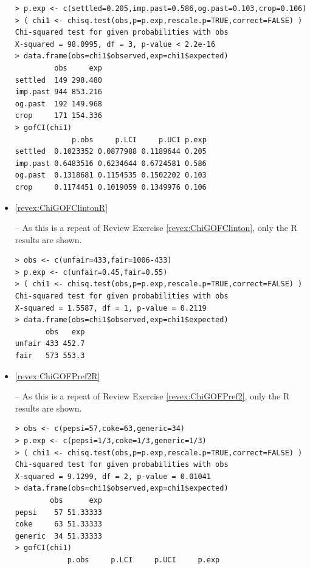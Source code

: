 \documentclass[10pt,openany]{book}\usepackage[]{graphicx}\usepackage[]{color}
\makeatletter
\newenvironment{kframe}{%
 \def\at@end@of@kframe{}%
 \ifinner\ifhmode%
  \def\at@end@of@kframe{\end{minipage}}%
  \begin{minipage}{\columnwidth}%
 \fi\fi%
 \def\FrameCommand##1{\hskip\@totalleftmargin \hskip-\fboxsep
 \colorbox{shadecolor}{##1}\hskip-\fboxsep
     \hskip-\linewidth \hskip-\@totalleftmargin \hskip\columnwidth}%
 \MakeFramed {\advance\hsize-\width
   \@totalleftmargin\z@ \linewidth\hsize
   \@setminipage}}%
 {\par\unskip\endMakeFramed%
 \at@end@of@kframe}
\newenvironment{knitrout}{}{} %
\makeatother
\begin{document}
\begin{itemize}
\begin{knitrout}
\begin{kframe}
\begin{verbatim}
> p.exp <- c(settled=0.205,imp.past=0.586,og.past=0.103,crop=0.106)
> ( chi1 <- chisq.test(obs,p=p.exp,rescale.p=TRUE,correct=FALSE) )
Chi-squared test for given probabilities with obs 
X-squared = 98.0995, df = 3, p-value < 2.2e-16
> data.frame(obs=chi1$observed,exp=chi1$expected)
         obs     exp
settled  149 298.480
imp.past 944 853.216
og.past  192 149.968
crop     171 154.336
> gofCI(chi1)
             p.obs     p.LCI     p.UCI p.exp
settled  0.1023352 0.0877988 0.1189644 0.205
imp.past 0.6483516 0.6234644 0.6724581 0.586
og.past  0.1318681 0.1154535 0.1502202 0.103
crop     0.1174451 0.1019059 0.1349976 0.106
\end{verbatim}
\end{kframe}
\end{knitrout}
  \item \hypertarget{ans:ChiGOFClintonR}{\ref{revex:ChiGOFClintonR}} -- As this is a repeat of Review Exercise \ref{revex:ChiGOFClinton}, only the R results are shown.
\begin{knitrout}
\color{fgcolor}\begin{kframe}
\begin{verbatim}
> obs <- c(unfair=433,fair=1006-433)
> p.exp <- c(unfair=0.45,fair=0.55)
> ( chi1 <- chisq.test(obs,p=p.exp,rescale.p=TRUE,correct=FALSE) )
Chi-squared test for given probabilities with obs 
X-squared = 1.5587, df = 1, p-value = 0.2119
> data.frame(obs=chi1$observed,exp=chi1$expected)
       obs   exp
unfair 433 452.7
fair   573 553.3
\end{verbatim}
\end{kframe}
\end{knitrout}
  \item \hypertarget{ans:ChiGOFPref2R}{\ref{revex:ChiGOFPref2R}} -- As this is a repeat of Review Exercise \ref{revex:ChiGOFPref2}, only the R results are shown.
\begin{knitrout}
\color{fgcolor}\begin{kframe}
\begin{verbatim}
> obs <- c(pepsi=57,coke=63,generic=34)
> p.exp <- c(pepsi=1/3,coke=1/3,generic=1/3)
> ( chi1 <- chisq.test(obs,p=p.exp,rescale.p=TRUE,correct=FALSE) )
Chi-squared test for given probabilities with obs 
X-squared = 9.1299, df = 2, p-value = 0.01041
> data.frame(obs=chi1$observed,exp=chi1$expected)
        obs      exp
pepsi    57 51.33333
coke     63 51.33333
generic  34 51.33333
> gofCI(chi1)
            p.obs     p.LCI     p.UCI     p.exp

\end{verbatim}
\end{kframe}
\end{knitrout}
\end{itemize}
\end{document}
